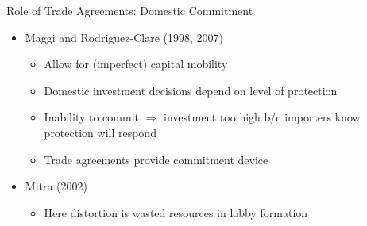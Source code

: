 \documentclass[handout]{beamer}
\begin{document}

\begin{frame}{Role of Trade Agreements: Domestic Commitment}
\pause
\begin{itemize}[<+->]
	\item Maggi and Rodriguez-Clare (1998, 2007)
		\begin{itemize}
			\item Allow for (imperfect) capital mobility
			\item Domestic investment decisions depend on level of protection
			\item Inability to commit $\Rightarrow$ investment too high b/c importers know protection will respond
			\item Trade agreements provide commitment device
    \end{itemize}
	\item Mitra (2002)
		\begin{itemize}
			\item Here distortion is wasted resources in lobby formation
		\end{itemize}
\end{itemize}
\end{frame} 
\end{document}
